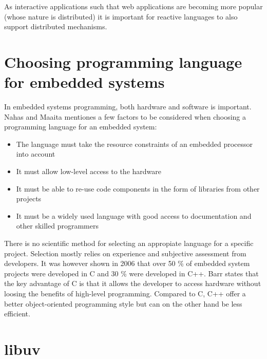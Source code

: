 As interactive applications such that web applications are becoming more
popular (whose nature is distributed) it is important for reactive languages to
also support distributed mechanisms.

\section{Choosing programming language for embedded systems}

In embedded systems programming, both hardware and software is important. Nahas
and Maaita \cite{nahas2012choosing} mentiones a few factors to be considered
when choosing a programming language for an embedded system:

\begin{itemize}
\item
  The language must take the resource constraints of an embedded processor
  into account
\item
  It must allow low-level access to the hardware
\item
  It must be able to re-use code components in the form of libraries from other
    projects
\item
  It must be a widely used language with good access to documentation and other
    skilled programmers
\end{itemize}

There is no scientific method for selecting an appropiate language for a
specific project. Selection mostly relies on experience and subjective
assessment from developers. It was however shown in 2006 that over 50 \% of
embedded system projects were developed in C and 30 \% were developed in C++.
Barr \cite{barr1999programming} states that the key advantage of C is that it
allows the developer to access hardware without loosing the benefits of
high-level programming. Compared to C, C++ offer a better object-oriented
programming style but can on the other hand be less efficient.
\cite{nahas2012choosing}

\section{libuv}


